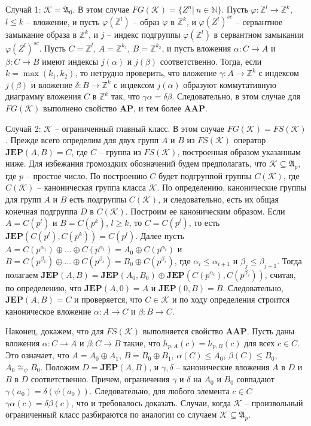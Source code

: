 \documentclass[12pt]{extarticle} %
\def\A{{\mathfrak{A}}}
\def\K{{\mathcal{K}}}
\def\Z{{\mathbb{Z}}}
\def\N{{\mathbb{N}}}
\def\JEP{\textbf{JEP}}
\def\AP{\textbf{AP}}
\def\AAP{\textbf{AAP}}
\begin{document}
Случай 1: $\K = \A_0$. В этом случае $FG(\K) = \{Z^n | \ n \in \N\}$. Пусть $\varphi: \Z^l \rightarrow \Z^k$, $l \leq k$ -- вложение, и пусть $\varphi(\Z^l)$ -- образ $\varphi$ в $\Z^k$, и $\varphi(Z^l)^{sc}$ -- сервантное замыкание образа в $\Z^k$, и $j$ -- индекс подгруппы $\varphi(\Z^l)$ в сервантном замыкании $\varphi(Z^l)^{sc}$. Пусть $C = \Z^l$, $A = \Z^{k_1}$, $B = \Z^{k_2}$, и пусть вложения $\alpha: C \rightarrow A$ и $\beta: C \rightarrow B$ имеют индексы $j(\alpha)$ и $j(\beta)$ соответственно. Тогда, если $k = \max(k_1, k_2)$, то нетрудно проверить, что вложение $\gamma: A \rightarrow \Z^k$ с индексом $j(\beta)$ и вложение $\delta: B \rightarrow \Z^k$ с индексом $j(\alpha)$ образуют коммутативную диаграмму вложения $C$ в $\Z^k$ так, что $\gamma \alpha = \delta \beta$. Следовательно, в этом случае для $FG(\K)$ выполнено свойство $\AP$, и тем более $\AAP$.

Случай 2: $\K$ -- ограниченный главный класс. В этом случае $FG(\K) = FS(\K)$. Прежде всего определим для двух групп $A$ и $B$ из $FS(\K)$ оператор $\JEP(A,B) = C$, где $C$ -- группа из $FS(\K)$, построенная образом указанным ниже. Для избежания громоздких обозначений будем предполагать, что $\K \subseteq \A_p$, где $p$ -- простое число. По построению $C$ будет подгруппой группы $C(\K)$, где $C(\K)$ -- каноническая группа класса $\K$. По определению, канонические группы для групп $A$ и $B$ есть подгруппы $C(\K)$, и следовательно, есть их общая конечная подгруппа $D$ в $C(\K)$. Построим ее каноническим образом. Если $A = C(p^l)$ и $B = C(p^k)$, $l \geq k$, то $C = C(p^l)$, то есть $\JEP(C(p^l), C(p^k)) = C(p^l)$. Далее пусть $A = C(p^{\alpha_1}) \oplus \ldots \oplus C(p^{\alpha_t}) = A_0 \oplus C(p^{\alpha_t})$ и $B = C(p^{\beta_1}) \oplus \ldots \oplus C(p^{\beta_s}) = B_0 \oplus C(p^{\beta_s})$, где $\alpha_i \leq \alpha_{i+1}$ и $\beta_j \leq \beta_{j+1}$. Тогда полагаем $\JEP(A, B) = \JEP(A_0, B_0) \oplus \JEP(C(p^{\alpha_t}), C(p^{\beta_s}))$, считая, по определению, что $\JEP(A, 0) = A$ и $\JEP(0, B) = B$. Следовательно, $\JEP(A,B) = C$ и проверяется, что $C \in \K$ и по ходу определения строится каноническое вложение $\alpha: A \rightarrow C$ и $\beta: B \rightarrow C$.

Наконец, докажем, что для $FS(\K)$ выполняется свойство $\AAP$. Пусть даны вложения $\alpha: C \rightarrow A$ и $\beta: C \rightarrow B$ такие, что $h_{p,A}(c) = h_{p,B}(c)$ для всех $c \in C$. Это означает, что $A = A_0 \oplus A_1$, $B = B_0 \oplus B_1$, $\alpha(C) \leq A_0$, $\beta(C) \leq B_0$, $A_0 \cong_\psi B_0$. Положим $D = \JEP(A, B)$, и $\gamma, \delta$ -- канонические вложения $A$ в $D$ и $B$ в $D$ соответственно. Причем, ограничения $\gamma$ и $\delta$ на $A_0$ и $B_0$ совпадают $\gamma(a_0) = \delta(\psi(a_0))$. Следовательно, для любого элемента $c \in C$ $\gamma \alpha(c) = \delta \beta(c)$, что и требовалось доказать. Случаи, когда $\K$ -- произвольный ограниченный класс разбираются по аналогии со случаем $\K \subseteq \A_p$.
\end{document}
